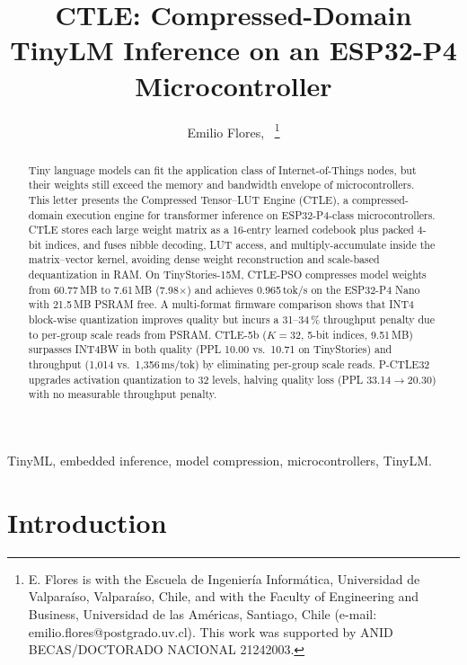 \documentclass[10pt,journal]{IEEEtran}
\begin{document}
\title{CTLE: Compressed-Domain TinyLM Inference on an ESP32-P4 Microcontroller}

\author{Emilio Flores,~%
\thanks{E. Flores is with the Escuela de Ingeniería Informática,
Universidad de Valparaíso, Valparaíso, Chile, and with the Faculty of
Engineering and Business, Universidad de las Américas, Santiago, Chile
(e-mail: emilio.flores@postgrado.uv.cl).
This work was supported by ANID BECAS/DOCTORADO NACIONAL 21242003.}}

\maketitle

\begin{abstract}
Tiny language models can fit the application class of Internet-of-Things nodes,
but their weights still exceed the memory and bandwidth envelope of
microcontrollers. This letter presents the Compressed Tensor--LUT Engine (CTLE),
a compressed-domain execution engine for transformer inference on ESP32-P4-class
microcontrollers. CTLE stores each large weight matrix as a 16-entry learned
codebook plus packed 4-bit indices, and fuses nibble decoding, LUT access, and
multiply-accumulate inside the matrix--vector kernel, avoiding dense weight
reconstruction and scale-based dequantization in RAM. On TinyStories-15M,
CTLE-PSO compresses model weights from 60.77\,MB to 7.61\,MB (7.98$\times$)
and achieves 0.965\,tok/s on the ESP32-P4 Nano with 21.5\,MB PSRAM free.
A multi-format firmware comparison shows that INT4 block-wise quantization
improves quality but incurs a 31--34\,\% throughput penalty due to per-group
scale reads from PSRAM. CTLE-5b ($K\!=\!32$, 5-bit indices, 9.51\,MB) surpasses
INT4BW in both quality (PPL 10.00 vs.\ 10.71 on TinyStories) and throughput
(1{,}014 vs.\ 1{,}356\,ms/tok) by eliminating per-group scale reads.
P-CTLE32 upgrades activation quantization to 32 levels, halving quality loss
(PPL 33.14$\to$20.30) with no measurable throughput penalty.
\end{abstract}

\begin{IEEEkeywords}
TinyML, embedded inference, model compression, microcontrollers, TinyLM.
\end{IEEEkeywords}


\section{Introduction}
\end{document}

